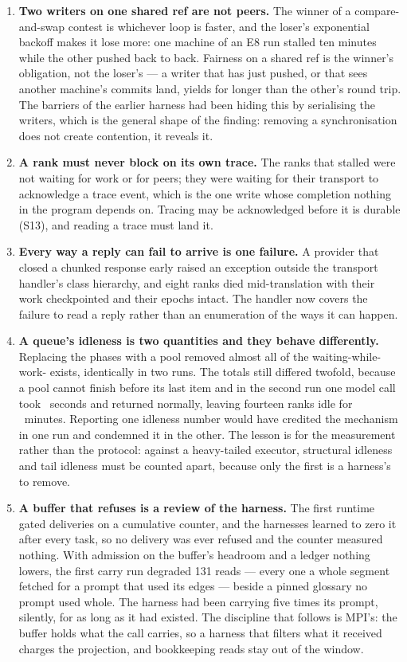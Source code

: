 \documentclass[sigconf,nonacm]{acmart}
\begin{document}
\begin{enumerate}
\item \textbf{Two writers on one shared ref are not peers.} The winner of a
compare-and-swap contest is whichever loop is faster, and the loser's exponential
backoff makes it lose more: one machine of an E8 run stalled ten minutes while
the other pushed back to back. Fairness on a shared ref is the winner's
obligation, not the loser's --- a writer that has just pushed, or that sees
another machine's commits land, yields for longer than the other's round trip.
The barriers of the earlier harness had been hiding this by serialising the
writers, which is the general shape of the finding: removing a synchronisation
does not create contention, it reveals it.

\item \textbf{A rank must never block on its own trace.} The ranks that stalled
were not waiting for work or for peers; they were waiting for their transport to
acknowledge a trace event, which is the one write whose completion nothing in the
program depends on. Tracing may be acknowledged before it is durable (S13), and
reading a trace must land it.

\item \textbf{Every way a reply can fail to arrive is one failure.} A provider
that closed a chunked response early raised an exception outside the transport
handler's class hierarchy, and eight ranks died mid-translation with their work
checkpointed and their epochs intact. The handler now covers the failure to read
a reply rather than an enumeration of the ways it can happen.

\item \textbf{A queue's idleness is two quantities and they behave differently.}
Replacing the phases with a pool removed almost all of the waiting-while-work-
exists, identically in two runs. The totals still differed twofold, because a
pool cannot finish before its last item and in the second run one model call took
\eEightBSlowestCallS\ seconds and returned normally, leaving fourteen ranks idle
for \eEightBTailMin\ minutes. Reporting one idleness number would have credited
the mechanism in one run and condemned it in the other. The lesson is for the
measurement rather than the protocol: against a heavy-tailed executor, structural
idleness and tail idleness must be counted apart, because only the first is a
harness's to remove.
\item \textbf{A buffer that refuses is a review of the harness.} The first
runtime gated deliveries on a cumulative counter, and the harnesses learned to
zero it after every task, so no delivery was ever refused and the counter
measured nothing. With admission on the buffer's headroom and a ledger nothing
lowers, the first carry run degraded 131 reads --- every one a whole segment
fetched for a prompt that used its edges --- beside a pinned glossary no prompt
used whole. The harness had been carrying five times its prompt, silently, for
as long as it had existed. The discipline that follows is MPI's: the buffer
holds what the call carries, so a harness that filters what it received charges
the projection, and bookkeeping reads stay out of the window.
\end{enumerate}
\end{document}

